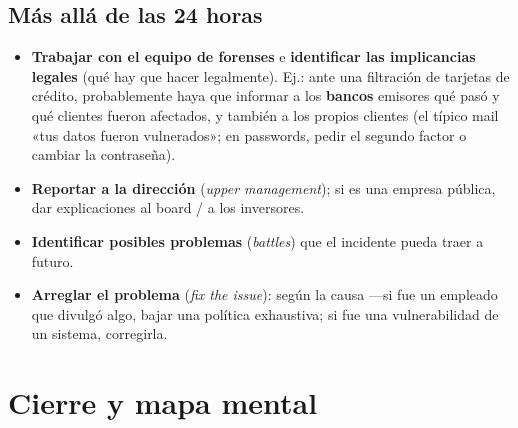 \documentclass[11pt,a4paper]{article}
\begin{document}
\subsection{Más allá de las 24 horas}

\begin{center}
\end{center}

\begin{itemize}[leftmargin=1.4em,itemsep=2pt]
  \item \textbf{Trabajar con el equipo de forenses} e \textbf{identificar las implicancias
        legales} (qué hay que hacer legalmente). Ej.: ante una filtración de tarjetas de
        crédito, probablemente haya que informar a los \textbf{bancos} emisores qué pasó y qué
        clientes fueron afectados, y también a los propios clientes (el típico mail «tus datos
        fueron vulnerados»; en passwords, pedir el segundo factor o cambiar la contraseña).
  \item \textbf{Reportar a la dirección} (\emph{upper management}); si es una empresa pública,
        dar explicaciones al board / a los inversores.
  \item \textbf{Identificar posibles problemas} (\emph{battles}) que el incidente pueda traer a
        futuro.
  \item \textbf{Arreglar el problema} (\emph{fix the issue}): según la causa —si fue un
        empleado que divulgó algo, bajar una política exhaustiva; si fue una vulnerabilidad de
        un sistema, corregirla.
\end{itemize}

\section{Cierre y mapa mental}
\end{document}
